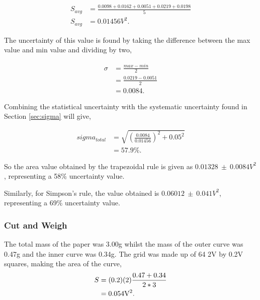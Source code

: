 \documentclass{article}
\begin{document}
\begin{equation}
    \begin{split}
    S_{avg} &= \frac{0.0098 + 0.0162 + 0.0051 + 0.0219 + 0.0198}{5} \\
    S_{avg} &= 0.01456 V^2.
    \end{split}
\end{equation}

The uncertainty of this value is found by taking the difference between the max value and min value
and dividing by two,

\begin{equation}
    \begin{split}
    \sigma &= \frac{max - min}{2} \\    
    &= \frac{0.0219 - 0.0051}{2} \\
    &= 0.0084.
    \end{split}
\end{equation}

Combining the statistical uncertainty with the systematic uncertainty found in Section \ref{sec:sigma} 
will give, 

\begin{equation}
    \begin{split}
    sigma_{total} &= \sqrt{(\frac{0.0084}{0.01456})^2+0.05^2} \\
    &= 57.9\%.    
    \end{split}
\end{equation}

So the area value obtained by the trapezoidal rule is given as $0.01328 \: \pm \: 0.0084 V^2$, 
representing a 58\% uncertainty value.

Similarly, for Simpson's rule, the value obtained is $0.06012 \: \pm \: 0.041 V^2$, representing 
a 69\% uncertainty value.

\subsubsection{Cut and Weigh}
The total mass of the paper was 3.00g whilst the mass of the outer curve was 0.47g and the inner 
curve was 0.34g. The grid was made up of 64 2V by 0.2V squares, making the area of the curve,
\begin{equation}
    \begin{split}
        S &= (0.2)(2)\frac{0.47+0.34}{2*3} \\
        &= 0.054 \text{V\textsuperscript{2}}.
    \end{split}
\end{equation}
\end{document}
